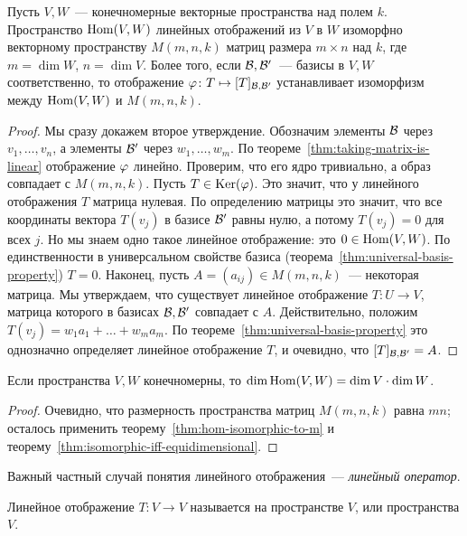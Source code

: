 \begin{theorem}\label{thm:hom-isomorphic-to-m}
Пусть $V,W$~--- конечномерные векторные пространства над полем $k$.
Пространство $\operatorname{Hom}(V,W)$ линейных отображений из $V$ в $W$ изоморфно
векторному пространству $M(m,n,k)$ матриц размера $m\times n$ над $k$,
где $m=\dim W$, $n=\dim V$.
Более того, если $\mathcal B,\mathcal B'$~--- базисы в $V,W$ соответственно, то
отображение $\varphi\colon T\mapsto [T]_{\mathcal B,\mathcal B'}$ устанавливает
изоморфизм между $\operatorname{Hom}(V,W)$ и $M(m,n,k)$.
\end{theorem}
\begin{proof}
Мы сразу докажем второе утверждение.
Обозначим элементы $\mathcal B$ через $v_1,\dots,v_n$,
а элементы $\mathcal B'$ через $w_1,\dots,w_m$.
По теореме~\ref{thm:taking-matrix-is-linear}
отображение $\varphi$ линейно. Проверим, что его ядро тривиально, а образ
совпадает с $M(m,n,k)$. Пусть $T\in\operatorname{Ker}(\varphi)$. Это значит, что у линейного
отображения $T$ матрица нулевая. По определению матрицы это значит,
что все координаты вектора $T(v_j)$ в базисе $\mathcal B'$ равны нулю,
а потому $T(v_j)=0$ для всех $j$. Но мы знаем одно такое линейное отображение:
это $0\in\operatorname{Hom}(V,W)$. По единственности в универсальном свойстве
базиса (теорема~\ref{thm:universal-basis-property}) $T=0$.
Наконец, пусть $A=(a_{ij})\in M(m,n,k)$~--- некоторая матрица. Мы утверждаем, что существует
линейное отображение $T\colon U\to V$, матрица которого в базисах $\mathcal B,\mathcal B'$
совпадает с $A$. Действительно, положим
$T(v_j) = w_1a_1+\dots+w_ma_m$. По теореме~\ref{thm:universal-basis-property}
это однозначно определяет линейное отображение $T$, и очевидно, что
$[T]_{\mathcal B,\mathcal B'} = A$.
\end{proof}

\begin{corollary}\label{cor:dim-of-hom-space}
Если пространства $V,W$ конечномерны, то $\dim\operatorname{Hom}(V,W) = \dim V\cdot\dim W$.
\end{corollary}
\begin{proof}
Очевидно, что размерность пространства матриц $M(m,n,k)$ равна $mn$; осталось
применить теорему~\ref{thm:hom-isomorphic-to-m}
и теорему~\ref{thm:isomorphic-iff-equidimensional}.
\end{proof}

Важный частный случай понятия линейного отображения~--- {\em линейный оператор}.
\begin{definition}
Линейное отображение $T\colon V\to V$ называется 
на пространстве $V$, или  пространства $V$.
\end{definition}

